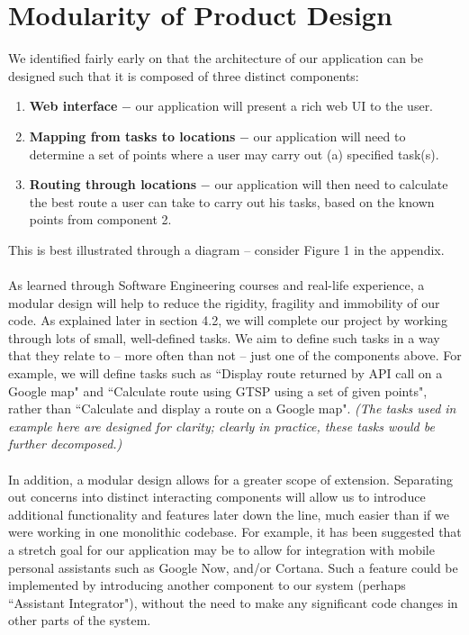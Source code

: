 \documentclass[10pt]{article}
\begin{document}
\section{Modularity of Product Design}
We identified fairly early on that the architecture of our application can be designed such that it is composed of three distinct components: \begin{enumerate}
\item \textbf{Web interface} $-$ our application will present a rich web UI to the user.
\item \textbf{Mapping from tasks to locations} $-$ our application will need to determine a set of points where a user may carry out (a) specified task(s).
\item \textbf{Routing through locations} $-$ our application will then need to calculate the best route a user can take to carry out his tasks, based on the known points from component 2.
\end{enumerate}
This is best illustrated through a diagram -- consider Figure 1 in the appendix.\\\\
As learned through Software Engineering courses and real-life experience, a modular design will help to reduce the rigidity, fragility and immobility of our code. As explained later in section 4.2, we will complete our project by working through lots of small, well-defined tasks. We aim to define such tasks in a way that they relate to -- more often than not -- just one of the components above. For example, we will define tasks such as ``Display route returned by API call on a Google map" and ``Calculate route using GTSP using a set of given points", rather than ``Calculate and display a route on a Google map". \textit{(The tasks used in example here are designed for clarity; clearly in practice, these tasks would be further decomposed.)} \\\\
In addition, a modular design allows for a greater scope of extension. Separating out concerns into distinct interacting components will allow us to introduce additional functionality and features later down the line, much easier than if we were working in one monolithic codebase. For example, it has been suggested that a stretch goal for our application may be to allow for integration with mobile personal assistants such as Google Now, and/or Cortana. Such a feature could be implemented by introducing another component to our system (perhaps ``Assistant Integrator"), without the need to make any significant code changes in other parts of the system.
\end{document}
